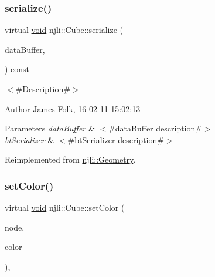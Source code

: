 \subsubsection{\texorpdfstring{serialize()}{serialize()}}
{\footnotesize\ttfamily virtual \mbox{\hyperlink{_thread_8h_af1e856da2e658414cb2456cb6f7ebc66}{void}} njli\+::\+Cube\+::serialize (\begin{DoxyParamCaption}\item[{\mbox{\hyperlink{_thread_8h_af1e856da2e658414cb2456cb6f7ebc66}{void}} $\ast$}]{data\+Buffer,  }\item[{bt\+Serializer $\ast$}]{ }\end{DoxyParamCaption}) const\hspace{0.3cm}{\ttfamily [virtual]}}



$<$\#\+Description\#$>$ 

\begin{DoxyAuthor}{Author}
James Folk, 16-\/02-\/11 15\+:02\+:13
\end{DoxyAuthor}

\begin{DoxyParams}{Parameters}
{\em data\+Buffer} & $<$\#data\+Buffer description\#$>$ \\
\hline
{\em bt\+Serializer} & $<$\#bt\+Serializer description\#$>$ \\
\hline
\end{DoxyParams}


Reimplemented from \mbox{\hyperlink{classnjli_1_1_geometry_a42a35911278eb52e0013d6dadd80271d}{njli\+::\+Geometry}}.

\mbox{\label{classnjli_1_1_cube_aa07b851ff55bd189771d467ca94be5fa}} 
\subsubsection{\texorpdfstring{set\+Color()}{setColor()}}
{\footnotesize\ttfamily virtual \mbox{\hyperlink{_thread_8h_af1e856da2e658414cb2456cb6f7ebc66}{void}} njli\+::\+Cube\+::set\+Color (\begin{DoxyParamCaption}\item[{\mbox{\hyperlink{classnjli_1_1_node}{Node}} $\ast$}]{node,  }\item[{const bt\+Vector4 \&}]{color }\end{DoxyParamCaption})\hspace{0.3cm}{\ttfamily [protected]}, {\ttfamily [virtual]}}



